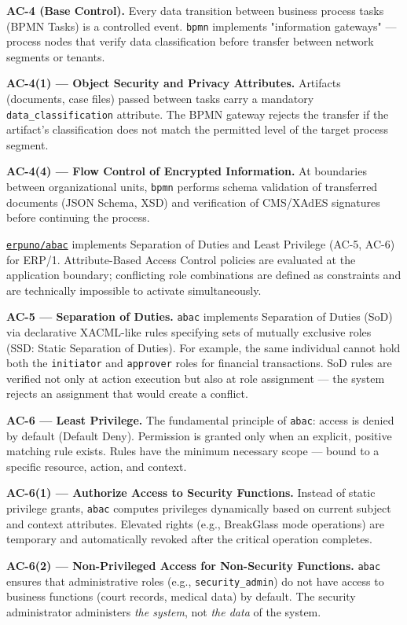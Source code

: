 \documentclass{article}
\begin{document}
\textbf{AC-4 (Base Control).}
Every data transition between business process tasks (BPMN Tasks) is a controlled event. \texttt{bpmn} implements "information gateways" --- process nodes that verify data classification before transfer between network segments or tenants.

\textbf{AC-4(1) --- Object Security and Privacy Attributes.}
Artifacts (documents, case files) passed between tasks carry a mandatory \texttt{data\_classification} attribute. The BPMN gateway rejects the transfer if the artifact's classification does not match the permitted level of the target process segment.

\textbf{AC-4(4) --- Flow Control of Encrypted Information.}
At boundaries between organizational units, \texttt{bpmn} performs schema validation of transferred documents (JSON Schema, XSD) and verification of CMS/XAdES signatures before continuing the process.

\href{https://github.com/erpuno/abac}{\texttt{erpuno/abac}} implements Separation of Duties and Least Privilege (AC-5, AC-6) for ERP/1. Attribute-Based Access Control policies are evaluated at the application boundary; conflicting role combinations are defined as constraints and are technically impossible to activate simultaneously.

\textbf{AC-5 --- Separation of Duties.}
\texttt{abac} implements Separation of Duties (SoD) via declarative XACML-like rules specifying sets of mutually exclusive roles (SSD: Static Separation of Duties). For example, the same individual cannot hold both the \texttt{initiator} and \texttt{approver} roles for financial transactions. SoD rules are verified not only at action execution but also at role assignment --- the system rejects an assignment that would create a conflict.

\textbf{AC-6 --- Least Privilege.}
The fundamental principle of \texttt{abac}: access is denied by default (Default Deny). Permission is granted only when an explicit, positive matching rule exists. Rules have the minimum necessary scope --- bound to a specific resource, action, and context.

\textbf{AC-6(1) --- Authorize Access to Security Functions.}
Instead of static privilege grants, \texttt{abac} computes privileges dynamically based on current subject and context attributes. Elevated rights (e.g., BreakGlass mode operations) are temporary and automatically revoked after the critical operation completes.

\textbf{AC-6(2) --- Non-Privileged Access for Non-Security Functions.}
\texttt{abac} ensures that administrative roles (e.g., \texttt{security\_admin}) do not have access to business functions (court records, medical data) by default. The security administrator administers \textit{the system}, not \textit{the data} of the system.
\end{document}
